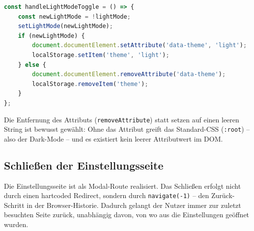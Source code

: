 \begin{lstlisting}[language=JavaScript, caption={Direkte DOM-Manipulation zur Theme-Umschaltung}]
const handleLightModeToggle = () => {
    const newLightMode = !lightMode;
    setLightMode(newLightMode);
    if (newLightMode) {
        document.documentElement.setAttribute('data-theme', 'light');
        localStorage.setItem('theme', 'light');
    } else {
        document.documentElement.removeAttribute('data-theme');
        localStorage.removeItem('theme');
    }
};
\end{lstlisting}

Die Entfernung des Attributs (\texttt{removeAttribute}) statt setzen auf einen leeren String ist bewusst gewählt: Ohne das Attribut greift das Standard-CSS (\texttt{:root}) -- also der Dark-Mode -- und es existiert kein leerer Attributwert im DOM.

\subsection{Schließen der Einstellungsseite}

Die Einstellungsseite ist als Modal-Route realisiert. Das Schließen erfolgt nicht durch einen hartcoded Redirect, sondern durch \texttt{navigate(-1)} -- den Zurück-Schritt in der Browser-Historie. Dadurch gelangt der Nutzer immer zur zuletzt besuchten Seite zurück, unabhängig davon, von wo aus die Einstellungen geöffnet wurden.
\newpage
